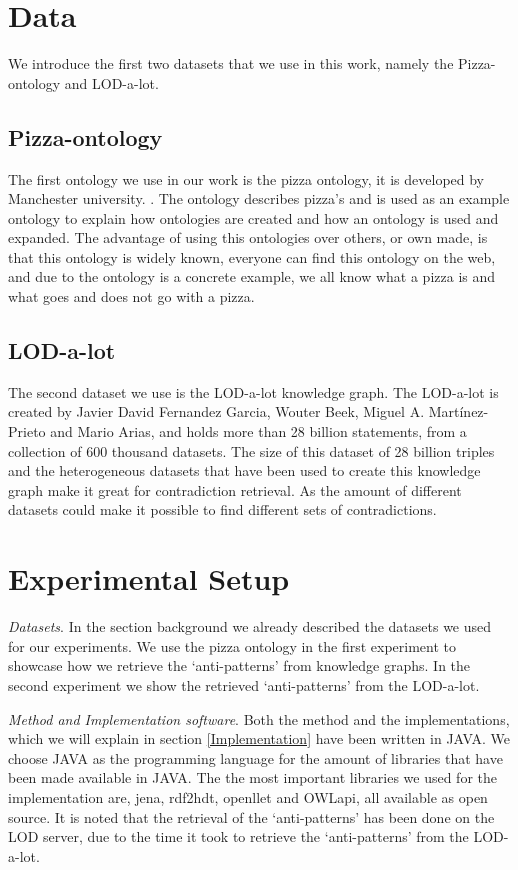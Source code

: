 \documentclass[11pt,letterpaper ,oneside ]{book}
\begin{document}
\section{Data}
We introduce the first two datasets that we use in this work, namely the Pizza-ontology and LOD-a-lot.

\subsection{Pizza-ontology}
The first ontology we use in our work is the pizza ontology, it is developed by Manchester university. \cite{pizza}. The ontology describes pizza's and is used as an example ontology to explain how ontologies are created and how an ontology is used and expanded. The advantage of using this ontologies over others, or own made, is that this ontology is widely known, everyone can find this ontology on the web, and due to the ontology is a concrete example, we all know what a pizza is and what goes and does not go with a pizza. \\

\subsection{LOD-a-lot}
The second dataset we use is the LOD-a-lot\cite{JavierD:2017} knowledge graph. The LOD-a-lot is created by Javier David Fernandez Garcia, Wouter Beek, Miguel A. Martínez-Prieto and Mario Arias, and holds more than 28 billion statements, from a collection of 600 thousand datasets. The size of this dataset of 28 billion triples and the heterogeneous datasets that have been used to create this knowledge graph make it great for contradiction retrieval. As the amount of different datasets could make it possible to find different sets of contradictions.

\section{Experimental Setup}
\textit{Datasets}. In the section background we already described the datasets we used for our experiments. We use the pizza ontology in the first experiment to showcase how we retrieve the `anti-patterns' from knowledge graphs. In the second experiment we show the retrieved `anti-patterns' from the LOD-a-lot.

\textit{Method and Implementation software}. Both the method and the implementations, which we will explain in section \ref{Implementation} have been written in JAVA. We choose JAVA as the programming language for the amount of libraries that have been made available in JAVA. The the most important libraries we used for the implementation are, jena, rdf2hdt, openllet and OWLapi, all available as open source. It is noted that the retrieval of the `anti-patterns' has been done on the LOD server, due to the time it took to retrieve the `anti-patterns' from the LOD-a-lot. 
\end{document}
